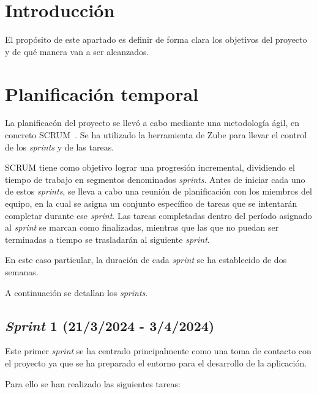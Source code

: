 
\section{Introducción}

El propósito de este apartado es definir de forma clara los objetivos del proyecto y de qué manera van a ser alcanzados.

\section{Planificación temporal}

La planificacón del proyecto se llevó a cabo mediante una metodología ágil, en concreto SCRUM~\cite{wearemarketing:scrum}. Se ha utilizado la herramienta de Zube para llevar el control de los \emph{sprints} y de las tareas.

SCRUM tiene como objetivo lograr una progresión incremental, dividiendo el tiempo de trabajo en segmentos denominados \emph{sprints}. Antes de iniciar cada uno de estos \emph{sprints}, se lleva a cabo una reunión de planificación con los miembros del equipo, en la cual se asigna un conjunto específico de tareas que se intentarán completar durante ese \emph{sprint}. Las tareas completadas dentro del período asignado al \emph{sprint} se marcan como finalizadas, mientras que las que no puedan ser terminadas a tiempo se trasladarán al siguiente \emph{sprint}.

En este caso particular, la duración de cada \emph{sprint} se ha establecido de dos semanas. 

A continuación se detallan los \emph{sprints}.

\subsection{\emph{Sprint} 1 (21/3/2024 - 3/4/2024)}

Este primer \emph{sprint} se ha centrado principalmente como una toma de contacto con el proyecto ya que se ha preparado el entorno para el desarrollo de la aplicación. 

Para ello se han realizado las siguientes tareas:

